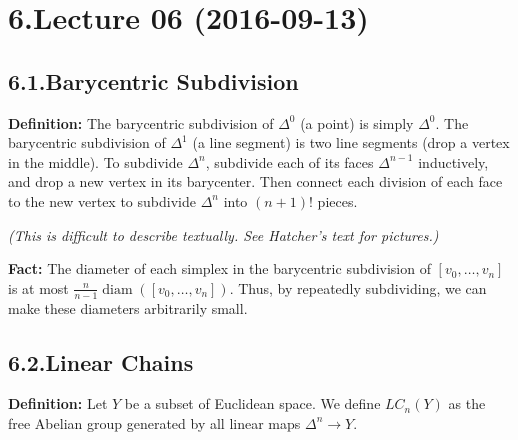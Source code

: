 \documentclass{article}
\begin{document}
\section{6.\hspace*{0.5em}Lecture 06 (2016-09-13)}\label{sec-lecture-06-2016-09-13}%

\subsection{6.1.\hspace*{0.5em}Barycentric Subdivision}\label{sec-barycentric-subdivision}%

\noindent{}\textbf{Definition:} The barycentric subdivision of $\Delta^0$ (a point) is simply $\Delta^0$. The barycentric subdivision of $\Delta^1$ (a line segment) is two line segments (drop a vertex in the middle). To subdivide $\Delta^n$, subdivide each of its faces $\Delta^{n-1}$ inductively, and drop a new vertex in its barycenter. Then connect each division of each face to the new vertex to subdivide $\Delta^n$ into $(n+1)!$ pieces.%

\emph{(This is difficult to describe textually. See Hatcher's text for pictures.)}%

\textbf{Fact:} The diameter of each simplex in the barycentric subdivision of $[v_0, \dots, v_n]$ is at most $\frac{n}{n-1} \operatorname{diam}([v_0, \dots, v_n])$. Thus, by repeatedly subdividing, we can make these diameters arbitrarily small.%

\subsection{6.2.\hspace*{0.5em}Linear Chains}\label{sec-linear-chains}%

\noindent{}\textbf{Definition:} Let $Y$ be a subset of Euclidean space. We define $LC_n(Y)$ as the free Abelian group generated by all linear maps $\Delta^n \to Y$.%
\end{document}
